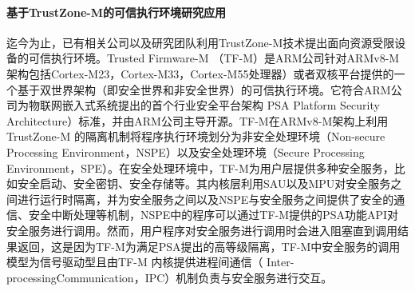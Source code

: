 \documentclass[12pt,a4paper]{ctexart}
\begin{document}
\paragraph{基于TrustZone-M的可信执行环境研究应用}
\par 迄今为止，已有相关公司以及研究团队利用TrustZone-M技术提出面向资源受限设备的可信执行环境。Trusted Firmware-M （TF-M）是ARM公司针对ARMv8-M架构包括Cortex-M23，Cortex-M33，Cortex-M55处理器）或者双核平台提供的一个基于双世界架构（即安全世界和非安全世界）的可信执行环境。它符合ARM公司为物联网嵌入式系统提出的首个行业安全平台架构 PSA Platform Security Architecture）标准，并由ARM公司主导开源。TF-M在ARMv8-M架构上利用TrustZone-M 的隔离机制将程序执行环境划分为非安全处理环境（Non-secure Processing Environment，NSPE）以及安全处理环境（Secure Processing Environment，SPE）。在安全处理环境中，TF-M为用户层提供多种安全服务，比如安全启动、安全密钥、安全存储等。其内核层利用SAU以及MPU对安全服务之间进行运行时隔离，并为安全服务之间以及NSPE与安全服务之间提供了安全的通信、安全中断处理等机制，NSPE中的程序可以通过TF-M提供的PSA功能API对安全服务进行调用。然而，用户程序对安全服务进行调用时会进入阻塞直到调用结果返回，这是因为TF-M为满足PSA提出的高等级隔离，TF-M中安全服务的调用模型为信号驱动型且由TF-M 内核提供进程间通信（ Inter-processingCommunication，IPC）机制负责与安全服务进行交互。
\end{document}
